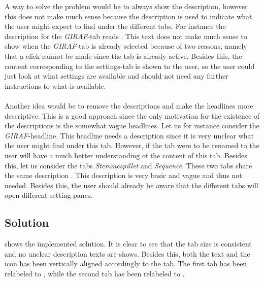 A way to solve the problem would be to always show the description, however this does not make much sense because the description is used to indicate what the user might expect to find under the different tabs. For instance the description for the \emph{GIRAF}-tab reads . This text does not make much sense to show when the \emph{GIRAF}-tab is already selected because of two reasons, namely that a click cannot be made since the tab is already active. Besides this, the content corresponding to the settings-tab is shown to the user, so the user could just look at what settings are available and should not need any further instructions to what is available.
\\\\
Another idea would be to remove the descriptions and make the headlines more descriptive. This is a good approach since the only motivation for the existence of the descriptions is the somewhat vague headlines. Let us for instance consider the \emph{GIRAF}-headline. This headline needs a description since it is very unclear what the user might find under this tab. However, if the tab were to be renamed to  the user will have a much better understanding of the content of this tab. Besides this, let us consider the tabs \emph{Stemmespillet} and \emph{Sequence}. These two tabs share the same description . This description is very basic and vague and thus not needed. Besides this, the user should already be aware that the different tabs will open different setting panes.

\subsection{Solution}
 shows the implemented solution. It is clear to see that the tab size is consistent and no unclear description texts are shows. Besides this, both the text and the icon has been vertically aligned accordingly to the tab. The first tab has been relabeled to , while the second tab has been relabeled to .

